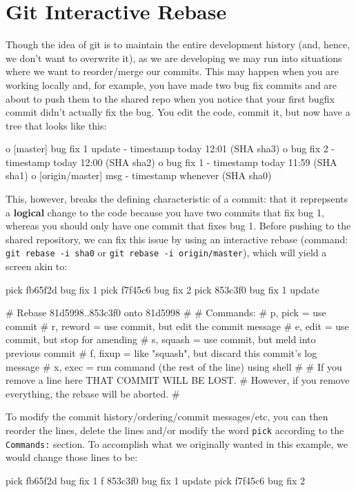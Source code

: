 \documentclass[10pt,letterpaper]{article}
\begin{document}
\section{Git Interactive Rebase}
Though the idea of git is to maintain the entire development history (and, hence, we don't want to overwrite it), as we are developing we may run into situations where we want to reorder/merge our commits. This may happen when you are working locally and, for example, you have made two bug fix commits and are about to push them to the shared repo when you notice that your first bugfix commit didn't actually fix the bug. You edit the code, commit it, but now have a tree that looks like this:
\begin{code}
o [master] bug fix 1 update - timestamp today 12:01 (SHA sha3)
o bug fix 2                 - timestamp today 12:00 (SHA sha2)
o bug fix 1                 - timestamp today 11:59 (SHA sha1)
o [origin/master] msg       - timestamp whenever    (SHA sha0)
\end{code}
This, however, breaks the defining characteristic of a commit: that it reprepsents a \textbf{logical} change to the code because you have two commits that fix bug 1, whereas you should only have one commit that fixes bug 1. Before pushing to the shared repository, we can fix this issue by using an interactive rebase (command: \texttt{git rebase -i sha0} or \texttt{git rebase -i origin/master}), which will yield a screen akin to:
\begin{code}
pick fb65f2d bug fix 1
pick f7f45c6 bug fix 2
pick 853c3f0 bug fix 1 update

# Rebase 81d5998..853c3f0 onto 81d5998
#
# Commands:
#  p, pick = use commit
#  r, reword = use commit, but edit the commit message
#  e, edit = use commit, but stop for amending
#  s, squash = use commit, but meld into previous commit
#  f, fixup = like "squash", but discard this commit's log message
#  x, exec = run command (the rest of the line) using shell
#
# If you remove a line here THAT COMMIT WILL BE LOST.
# However, if you remove everything, the rebase will be aborted.
#
\end{code}
\noindent To modify the commit history/ordering/commit messages/etc, you can then reorder the lines, delete the lines and/or modify the word \texttt{pick} according to the \texttt{Commands:} section. To accomplish what we originally wanted in this example, we would change those lines to be:
\begin{code}
pick fb65f2d bug fix 1
f 853c3f0 bug fix 1 update
pick f7f45c6 bug fix 2
\end{code}
\end{document}
